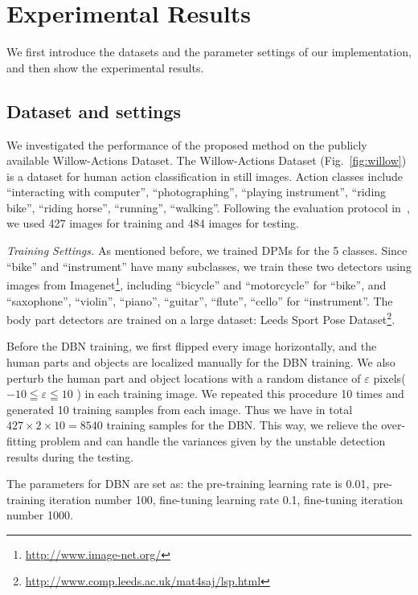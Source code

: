 \documentclass{article}
\begin{document}
\section{Experimental Results}
\label{sec:exp}

We first introduce the datasets and the parameter settings of our implementation, and then show the experimental results.

\subsection{Dataset and settings}

We investigated the performance of the proposed method on the publicly available Willow-Actions Dataset\cite{Delaitre10}.  The Willow-Actions Dataset (Fig.~\ref{fig:willow}) is a dataset for human action classification in still images.  Action classes include ``interacting with computer'', ``photographing'', ``playing instrument'', ``riding bike'', ``riding horse'', ``running'', ``walking''.  Following the evaluation protocol in~\cite{Delaitre10}, we used 427 images for training and 484 images for testing.

\emph{Training Settings.} As mentioned before, we trained DPMs for the 5 classes.  Since ``bike'' and ``instrument'' have many subclasses, we train these two detectors using images from Imagenet\footnote{\url{http://www.image-net.org/}}, including ``bicycle'' and ``motorcycle'' for ``bike'', and ``saxophone'', ``violin'', ``piano'', ``guitar'', ``flute'', ``cello'' for ``instrument''.  The body part detectors are trained on a large dataset: Leeds Sport Pose Dataset\footnote{\url{http://www.comp.leeds.ac.uk/mat4saj/lsp.html}}.

Before the DBN training, we first flipped every image horizontally, and the human parts and objects are localized manually for the DBN training.  We also perturb the human part and object locations with a random distance of $\varepsilon$ pixels($-10 \leqq \varepsilon \leqq 10$ ) in each training image.  We repeated this procedure 10 times and generated 10 training samples from each image.  Thus we have in total $427 \times 2 \times 10 = 8540$ training samples for the DBN.  This way, we relieve the over-fitting problem and can handle the variances given by the unstable detection results during the testing.

The parameters for DBN are set as: the pre-training learning rate is 0.01, pre-training iteration number 100, fine-tuning learning rate 0.1, fine-tuning iteration number 1000.
\end{document}

